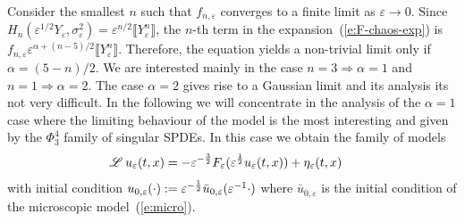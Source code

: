 Consider the smallest $n$ such that $f_{n, \varepsilon}$ converges to a finite
limit as $\varepsilon \rightarrow 0$. Since $H_n (\varepsilon^{1 / 2}
Y_{\varepsilon}, \sigma_{\varepsilon}^2) = \varepsilon^{n / 2} \llbracket
Y_{\varepsilon}^n \rrbracket$, the $n$-th term in the
expansion~(\ref{e:F-chaos-exp}) is $f_{n, \varepsilon} \varepsilon^{\alpha +
(n - 5) / 2} \llbracket Y_{\varepsilon}^n \rrbracket$. Therefore, the equation
yields a non-trivial limit only if $\alpha = (5 - n) / 2$. We are interested
mainly in the case $n = 3 \Rightarrow \alpha = 1$ and $n = 1 \Rightarrow
\alpha = 2$. The case $\alpha = 2$ gives rise to a Gaussian limit and its
analysis its not very difficult. In the following we will concentrate in the
analysis of the $\alpha = 1$ case where the limiting behaviour of the model is
the most interesting and given by the $\Phi^4_3$ family of singular SPDEs. In
this case we obtain the family of models
\begin{equation}
  \mathscr{L} \hspace{.2em} u_{\varepsilon} (t, x) = - \varepsilon^{- \frac{3}{2}} F_{\varepsilon}
  (\varepsilon^{\frac{1}{2}} u_{\varepsilon} (t, x)) + \eta_{\varepsilon} (t,
  x) \quad \label{e:univ}
\end{equation}
with initial condition $u_{0, \varepsilon} (\cdot) := \varepsilon^{-
\frac{1}{2}} \bar{u}_{0, \varepsilon} (\varepsilon^{- 1} \cdot)$ where
$\bar{u}_{0, \varepsilon}$ is the initial condition of the microscopic
model~(\ref{e:micro}).

